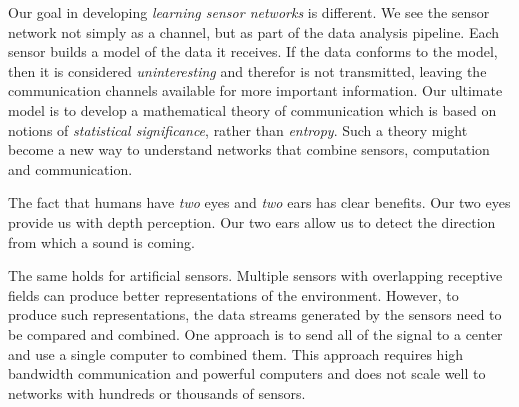 \documentclass{article}
\begin{document}
Our goal in developing {\em learning sensor networks} is different. We see the sensor network not simply as a channel, but as part of the data analysis pipeline. Each sensor builds a model of the data it receives. If the data conforms to the model, then it is considered {\em uninteresting} and therefor is not transmitted, leaving the communication channels available for more important information. Our ultimate model is to develop a mathematical theory of communication which is based on notions of {\em statistical significance}, rather than {\em entropy}. Such a theory might become a new way to understand networks that combine sensors, computation and communication.

\iffalse
Thus, we will develop new techniques for designing the geometry of sensor networks in a way that maximizes their ability to perform their requisite data-processing task while minimizing their communication. For this, we will use and develop methods from Sparse linear arrays such as co-prime and nested arrays.
We will use the array to localize and identify weak sounds and extract information about the environment. We will use graph theoretic ideas to guide our design and analysis of communication protocols among sensors. We will design and analyze computationally efficient binary sketches that sufficiently summarize the data collected at each sensor. This will allow the sensors to efficiently collaborate to perform various statistical tasks including, for example, change-point detection, correlation analysis, and two-sample tests, using kernel methods. For this, we will use and develop methods in applied harmonic analysis, high dimensional probability, and machine learning. 
\fi






\iffalse The fact that humans have {\em two} eyes and {\em two} ears has clear
benefits. Our two eyes provide us with depth perception. Our two ears
allow us to detect the direction from which a sound is coming.

The same holds for artificial sensors. Multiple sensors with
overlapping receptive fields can produce better representations of the
environment. However, to produce such representations, the data
streams generated by the sensors need to be compared and combined. One
approach is to send all of the signal to a center and use a single
computer to combined them. This approach requires high bandwidth
communication and powerful computers and does not scale well to
networks with hundreds or thousands of sensors.
\end{document}
